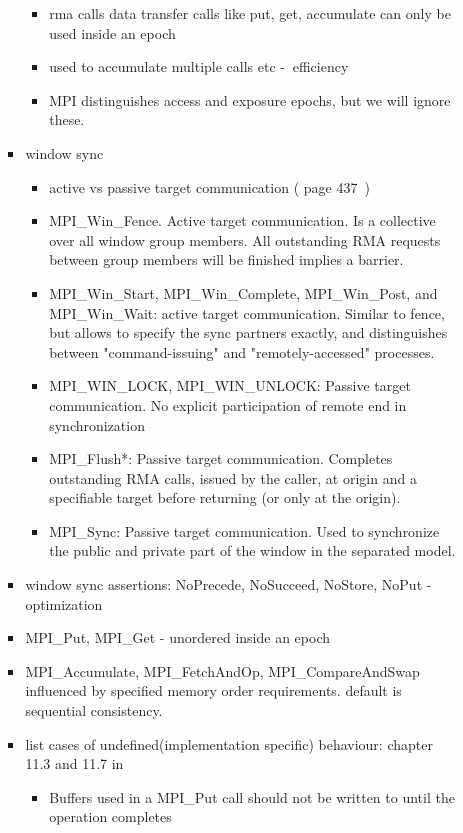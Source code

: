 \documentclass[a4paper, 10pt]{article}
\begin{document}
\begin{itemize}
\begin{itemize}
\begin{itemize}
\begin{itemize}
							\item rma calls data transfer calls like put, get, accumulate can only be used inside an epoch
							\item used to accumulate multiple calls etc -$\>$ efficiency
							\item MPI distinguishes access and exposure epochs, but we will ignore these.
						\end{itemize}
					\item window sync
						\begin{itemize}
							\item active vs passive target communication (\cite{mpi3} page 437~)
							\item MPI\_Win\_Fence. Active target communication. Is a collective over all window group members. All outstanding RMA requests between group members will be finished implies a barrier.
							\item MPI\_Win\_Start, MPI\_Win\_Complete, MPI\_Win\_Post, and MPI\_Win\_Wait: active target communication. Similar to fence, but allows to specify the sync partners exactly, and distinguishes between "command-issuing" and "remotely-accessed" processes.
							\item MPI\_WIN\_LOCK, MPI\_WIN\_UNLOCK: Passive target communication. No explicit participation of remote end in synchronization
							\item MPI\_Flush*: Passive target communication. Completes outstanding RMA calls, issued by the caller, at origin and a specifiable target before returning (or only at the origin).
							\item MPI\_Sync: Passive target communication. Used to synchronize the public and private part of the window in the separated model.
						\end{itemize}
					\item window sync assertions: NoPrecede, NoSucceed, NoStore, NoPut -$\>$ optimization
					\item MPI\_Put, MPI\_Get - unordered inside an epoch
					\item MPI\_Accumulate, MPI\_FetchAndOp, MPI\_CompareAndSwap influenced by specified memory order requirements. default is sequential consistency.
					\item list cases of undefined(implementation specific) behaviour: chapter 11.3 and 11.7 in \cite{mpi3}
						\begin{itemize}
							\item Buffers used in a MPI\_Put call should not be written to until the operation completes

\end{itemize}
\end{itemize}
\end{itemize}
\end{itemize}
\end{document}

